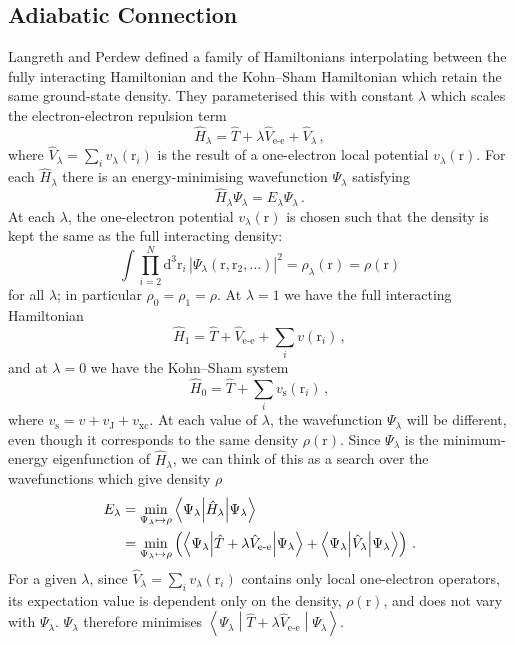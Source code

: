 \documentclass{article}
\theoremstyle{plain}\theoremheaderfont{\normalfont\itshape}\theorembodyfont{\rmfamily}\theoremseparator{.}\newtheorem*{rem}{Remark}\newtheorem*{ex}{Example}\newtheorem*{proof}{Proof}\newtheorem*{altp}{Alternative proof}
\theoremstyle{plain}\theoremheaderfont{\normalfont\bfseries}\theorembodyfont{\rmfamily}\theoremseparator{.}\newtheorem{thm}{Theorem}[section]\newtheorem{lem}[thm]{Lemma}\newtheorem{prop}[thm]{Proposition}\newtheorem*{cor}{Corollary}\newtheorem{defn}[thm]{Definition}\newtheorem{clm}[thm]{Claim}\newtheorem{clminproof}{Claim}
\theoremstyle{break}\theoremheaderfont{\normalfont\itshape}\theorembodyfont{\rmfamily}\theoremseparator{.\medskip}\newtheorem*{proofskip}{Proof}\newtheorem*{exs}{Examples}\newtheorem*{rems}{Remarks}
\theoremstyle{break}\theoremheaderfont{\normalfont\bfseries}\theorembodyfont{\rmfamily}\theoremseparator{.\medskip}\newtheorem{lemskip}[thm]{Lemma}\newtheorem{defnskip}[thm]{Definition}\newtheorem{propskip}[thm]{Proposition}\newtheorem{thmskip}[thm]{Theorem}
\numberwithin{equation}{section}
\newcommand{\dd}[2][]{\mathrm{d}^{#1} #2\,}
\newcommand{\expval}[2]{\left\langle #2 \middle| #1 \middle| #2 \right\rangle}
\newcommand{\vb}[1]{\bm{\mathrm{#1}}}
\newcommand{\abs}[1]{\left| #1 \right|}
\newcommand{\ee}{_{\text{e-e}}}
\newcommand{\s}{_{\text{s}}}
\newcommand{\xc}{_{\text{xc}}}
\begin{document}
    \subsection{Adiabatic Connection}
    Langreth and Perdew defined a family of Hamiltonians interpolating between the fully interacting Hamiltonian and the Kohn--Sham Hamiltonian which retain the same ground-state density. They parameterised this with constant \(\lambda\) which scales the electron-electron repulsion term
    \begin{equation}
        \hat{H}_\lambda=\hat{T}+\lambda\hat{V}\ee+\hat{V}_{\lambda}\,,
    \end{equation}
    where \(\hat{V}_\lambda=\sum_i v_\lambda(\vb{r}_i)\) is the result of a one-electron local potential \(v_\lambda(\vb{r})\). For each \(\hat{H}_\lambda\) there is an energy-minimising wavefunction \(\Psi_\lambda\) satisfying
    \begin{equation}
        \hat{H}_\lambda\Psi_\lambda=E_\lambda\Psi_\lambda\,.
    \end{equation}
    At each \(\lambda\), the one-electron potential \(v_\lambda(\vb{r})\) is chosen such that the density is kept the same as the full interacting density:
    \begin{equation}
        \int\prod_{i=2}^{N}\dd[3]{\vb{r}_i}\abs{\Psi_\lambda(\vb{r},\vb{r}_2,\dots)}^2=\rho_\lambda(\vb{r})=\rho(\vb{r})
    \end{equation}
    for all \(\lambda\); in particular \(\rho_0=\rho_1=\rho\). At \(\lambda=1\) we have the full interacting Hamiltonian
    \begin{equation}
        \hat{H}_1=\hat{T}+\hat{V}\ee+\sum_{i}v(\vb{r}_i)\,,
    \end{equation}
    and at \(\lambda=0\) we have the Kohn--Sham system
    \begin{equation}
        \hat{H}_0=\hat{T}+\sum_i v\s(\vb{r}_i)\,,
    \end{equation}
    where \(v\s=v+v_{\text{J}}+v\xc\). At each value of \(\lambda\), the wavefunction \(\Psi_\lambda\) will be different, even though it corresponds to the same density \(\rho(\vb{r})\). Since \(\Psi_{\lambda}\) is the minimum-energy eigenfunction of \(\hat{H}_\lambda\), we can think of this as a search over the wavefunctions which give density \(\rho\)
    \begin{align}
        E_\lambda&=\min_{\Psi_\lambda\mapsto\rho}\expval{\hat{H}_\lambda}{\Psi_\lambda}\notag\\
        &=\min_{\Psi_\lambda\mapsto\rho}\left(\expval{\hat{T}+\lambda\hat{V}\ee}{\Psi_\lambda}+\expval{\hat{V}_\lambda}{\Psi_\lambda}\right)\,.
    \end{align}
    For a given \(\lambda\), since \(\hat{V}_\lambda=\sum_i v_\lambda(\vb{r}_i)\) contains only local one-electron operators, its expectation value is dependent only on the density, \(\rho(\vb{r})\), and does not vary with \(\Psi_{\lambda}\). \(\Psi_{\lambda}\) therefore minimises \(\expval{\hat{T}+\lambda\hat{V}\ee}{\Psi_\lambda}\).
\end{document}
